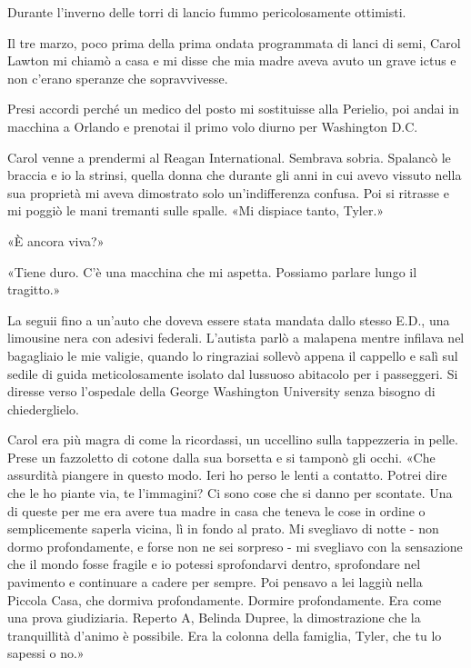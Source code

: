Durante l'inverno delle torri di lancio fummo pericolosamente ottimisti.

\separatorefiori

Il tre marzo, poco prima della prima ondata programmata di lanci di
semi, Carol Lawton mi chiamò a casa e mi disse che mia madre aveva avuto
un grave ictus e non c'erano speranze che sopravvivesse.

Presi accordi perché un medico del posto mi sostituisse alla Perielio,
poi andai in macchina a Orlando e prenotai il primo volo diurno per
Washington D.C.

Carol venne a prendermi al Reagan International. Sembrava sobria.
Spalancò le braccia e io la strinsi, quella donna che durante gli anni
in cui avevo vissuto nella sua proprietà mi aveva dimostrato solo
un'indifferenza confusa. Poi si ritrasse e mi poggiò le mani tremanti
sulle spalle. «Mi dispiace tanto, Tyler.»

«È ancora viva?»

«Tiene duro. C'è una macchina che mi aspetta. Possiamo parlare lungo il
tragitto.»

La seguii fino a un'auto che doveva essere stata mandata dallo stesso
E.D., una limousine nera con adesivi federali. L'autista parlò a
malapena mentre infilava nel bagagliaio le mie valigie, quando lo
ringraziai sollevò appena il cappello e salì sul sedile di guida
meticolosamente isolato dal lussuoso abitacolo per i passeggeri. Si
diresse verso l'ospedale della George Washington University senza
bisogno di chiederglielo.

Carol era più magra di come la ricordassi, un uccellino sulla
tappezzeria in pelle. Prese un fazzoletto di cotone dalla sua borsetta e
si tamponò gli occhi. «Che assurdità piangere in questo modo. Ieri ho
perso le lenti a contatto. Potrei dire che le ho piante via, te
l'immagini? Ci sono cose che si danno per scontate. Una di queste per me
era avere tua madre in casa che teneva le cose in ordine o semplicemente
saperla vicina, lì in fondo al prato. Mi svegliavo di notte - non dormo
profondamente, e forse non ne sei sorpreso - mi svegliavo con la
sensazione che il mondo fosse fragile e io potessi sprofondarvi dentro,
sprofondare nel pavimento e continuare a cadere per sempre. Poi pensavo
a lei laggiù nella Piccola Casa, che dormiva profondamente. Dormire
profondamente. Era come una prova giudiziaria. Reperto A, Belinda
Dupree, la dimostrazione che la tranquillità d'animo è possibile. Era la
colonna della famiglia, Tyler, che tu lo sapessi o no.»


